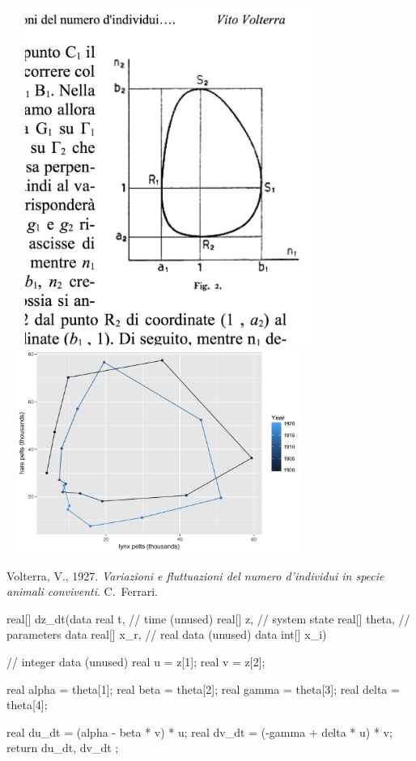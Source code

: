 \documentclass[10pt]{report}
\begin{document}
\begin{minipage}[t]{0.20\textwidth}
\mbox{ }
\vspace*{0.5in}
\mbox{ } \hfill
\includegraphics[width=0.7\textwidth]{img/volterra-orbit.jpg}
\\[-8pt]
\mbox{ }
\hfill
\includegraphics[width=0.7\textwidth]{img/hare-lynx-pelts-2.png}
\end{minipage}
\vfill
\hfill
{\tiny
Volterra, V., 1927. {\slshape Variazioni
e fluttuazioni del numero d'individui in specie animali
conviventi}. C.~Ferrari.
}



%
\vspace*{-2pt}
{\footnotesize
\begin{stancode}
  real[] dz_dt(data real t,       // time (unused)
               real[] z,          // system state
               real[] theta,      // parameters
               data real[] x_r,   // real data (unused)
               data int[] x_i) {  // integer data (unused)
    real u = z[1];            real v = z[2];

    real alpha = theta[1];    real beta = theta[2];
    real gamma = theta[3];    real delta = theta[4];

    real du_dt = (alpha - beta * v) * u;
    real dv_dt = (-gamma + delta * u) * v;
    return { du_dt, dv_dt };
  }
\end{stancode}
}
\end{document}
